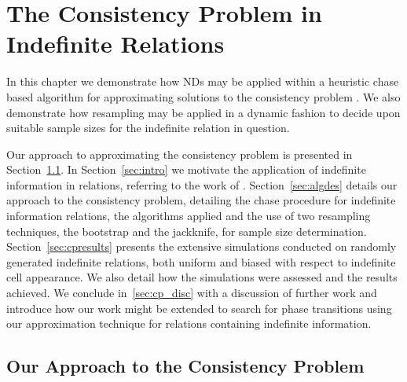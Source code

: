 \chapter{The Consistency Problem in Indefinite
Relations}\label{chap:consistency} 

In this chapter we demonstrate how NDs may be applied within a
heuristic chase based algorithm for approximating solutions to the
consistency problem \cite{vn95}. We also demonstrate how resampling
may be applied in a dynamic fashion to decide upon suitable sample
sizes for the indefinite relation in question.

\medskip

Our approach to approximating the consistency problem is presented in
Section~\ref{sec:conprob}. In Section~\ref{sec:intro} we motivate the
application of indefinite 
information in relations, referring to the work of
\cite{vn95,inv91,ivv95}.   Section~\ref{sec:algdes} details our
approach to the consistency problem, detailing the chase procedure for
indefinite information relations, the algorithms applied and the use
of two resampling techniques, the bootstrap and the jackknife, for
sample size determination. Section~\ref{sec:cpresults} presents the
extensive simulations conducted on randomly generated indefinite
relations, both uniform and biased with respect to indefinite cell
appearance. We also detail how the simulations were
assessed and the results achieved. We conclude in~\ref{sec:cp_disc}
with a discussion of further work and introduce how our work might be
extended to search for phase transitions using our approximation
technique for relations containing indefinite information.


\section{Our Approach to the Consistency Problem}\label{sec:conprob}


